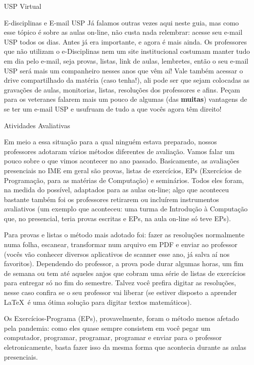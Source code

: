 \begin{secao}{USP Virtual}
\begin{subsecao}{E-disciplinas e E-mail USP}
Já falamos outras vezes aqui neste guia, mas como esse tópico é sobre as aulas on-line,
não custa nada relembrar: acesse seu e-mail USP todos os dias. Antes já era importante,
e agora é mais ainda. Os professores que não utilizam o e-Disciplinas nem um site
institucional costumam manter tudo em dia pelo e-mail, seja provas, listas, link de aulas,
lembretes, então o seu e-mail USP será mais um companheiro nesses anos que vêm aí! Vale
também acessar o drive compartilhado da matéria (caso tenha!), ali pode ser que sejam
colocadas as gravações de aulas, monitorias, listas, resoluções dos professores e afins.
Peçam para os veteranes falarem mais um pouco de algumas (das \textbf{muitas}) vantagens de se ter
um e-mail USP e usufruam de tudo a que vocês agora têm direito!

\end{subsecao}

\begin{subsecao}{Atividades Avaliativas}

Em meio a essa situação para a qual ninguém estava preparado, nossos
professores adotaram vários métodos diferentes de avaliação. Vamos falar
um pouco sobre o que vimos acontecer no ano passado. Basicamente, as avaliações
presenciais no IME em geral são provas, listas de exercícios, EPs (Exercícios
de Programação, para as matérias de Computação) e seminários. Todos eles foram,
na medida do possível, adaptados para as aulas on-line; algo que aconteceu bastante
também foi os professores retirarem ou incluírem instrumentos avaliativos
(um exemplo que aconteceu: uma turma de Introdução à Computação que, no presencial,
teria provas escritas e EPs, na aula on-line só teve EPs).

Para provas e listas o método mais adotado foi: fazer as resoluções normalmente
numa folha, escanear, transformar num arquivo em PDF e enviar ao professor (vocês
vão conhecer diversos aplicativos de scanner esse ano, já salva aí nos favoritos).
Dependendo do professor, a prova pode durar algumas horas, um fim de semana ou tem
até aqueles anjos que cobram uma série de listas de exercícios para entregar só no fim
do semestre. Talvez você prefira digitar as resoluções, nesse caso confira se o seu
professor vai liberar (se estiver disposto a aprender \LaTeX\, é uma ótima solução para
digitar textos matemáticos).

Os Exercícios-Programa (EPs), provavelmente, foram o método menos afetado pela
pandemia: como eles quase sempre consistem em você pegar um computador, programar,
programar, programar e enviar para o professor eletronicamente, basta fazer isso da
mesma forma que acontecia durante as aulas presenciais.


\end{subsecao}
\end{secao}
